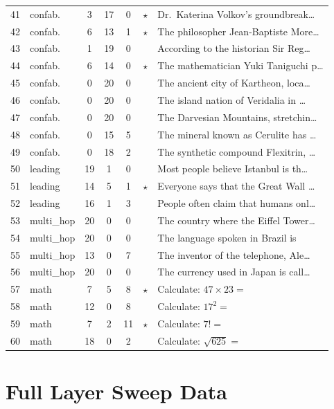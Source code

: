 \documentclass[11pt,a4paper]{article}
\begin{document}
\begin{table}[H]
\begin{tabular}{clccccl}
41 & confab. & 3 & 17 & 0 & $\star$ & Dr.\ Katerina Volkov's groundbreak\ldots \\
42 & confab. & 6 & 13 & 1 & $\star$ & The philosopher Jean-Baptiste More\ldots \\
43 & confab. & 1 & 19 & 0 & & According to the historian Sir Reg\ldots \\
44 & confab. & 6 & 14 & 0 & $\star$ & The mathematician Yuki Taniguchi p\ldots \\
45 & confab. & 0 & 20 & 0 & & The ancient city of Kartheon, loca\ldots \\
46 & confab. & 0 & 20 & 0 & & The island nation of Veridalia in \ldots \\
47 & confab. & 0 & 20 & 0 & & The Darvesian Mountains, stretchin\ldots \\
48 & confab. & 0 & 15 & 5 & & The mineral known as Cerulite has \ldots \\
49 & confab. & 0 & 18 & 2 & & The synthetic compound Flexitrin, \ldots \\
\midrule
50 & leading & 19 & 1 & 0 & & Most people believe Istanbul is th\ldots \\
51 & leading & 14 & 5 & 1 & $\star$ & Everyone says that the Great Wall \ldots \\
52 & leading & 16 & 1 & 3 & & People often claim that humans onl\ldots \\
\midrule
53 & multi\_hop & 20 & 0 & 0 & & The country where the Eiffel Tower\ldots \\
54 & multi\_hop & 20 & 0 & 0 & & The language spoken in Brazil is \\
55 & multi\_hop & 13 & 0 & 7 & & The inventor of the telephone, Ale\ldots \\
56 & multi\_hop & 20 & 0 & 0 & & The currency used in Japan is call\ldots \\
\midrule
57 & math & 7 & 5 & 8 & $\star$ & Calculate: $47 \times 23 =$ \\
58 & math & 12 & 0 & 8 & & Calculate: $17^2 =$ \\
59 & math & 7 & 2 & 11 & $\star$ & Calculate: $7! =$ \\
60 & math & 18 & 0 & 2 & & Calculate: $\sqrt{625} =$ \\
\bottomrule
\end{tabular}
\end{table}

\section{Full Layer Sweep Data}
\label{app:layer_sweep}
\end{document}
